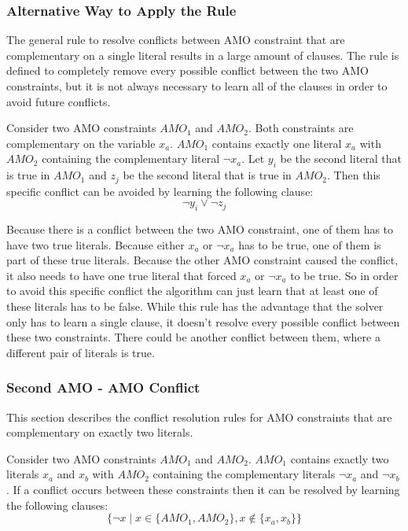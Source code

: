 \subsubsection{Alternative Way to Apply the Rule}

The general rule to resolve conflicts between AMO constraint that are complementary on a single literal results in a large amount of clauses. The rule is defined to completely remove every possible conflict between the two AMO constraints, but it is not always necessary to learn all of the clauses in order to avoid future conflicts.

\begin{leftbar}
Consider two AMO constraints $AMO_1$ and $AMO_2$. Both constraints are complementary on the variable $x_a$. $AMO_1$ contains exactly one literal $x_a$ with $AMO_2$ containing the complementary literal $\neg x_a$. Let $y_i$ be the second literal that is true in $AMO_1$ and $z_j$ be the second literal that is true in $AMO_2$. Then this specific conflict can be avoided by learning the following clause:
\begin{displaymath}
\neg y_i \vee \neg z_j
\end{displaymath}
\end{leftbar}

Because there is a conflict between the two AMO constraint, one of them has to have two true literals. Because either $x_a$ or $\neg x_a$ has to be true, one of them is part of these true literals. Because the other AMO constraint caused the conflict, it also needs to have one true literal that forced $x_a$ or $\neg x_a$ to be true. So in order to avoid this specific conflict the algorithm can just learn that at least one of these literals has to be false. While this rule has the advantage that the solver only has to learn a single clause, it doesn't resolve every possible conflict between these two constraints. There could be another conflict between them, where a different pair of literals is true.

\subsubsection{Second AMO - AMO Conflict}

This section describes the conflict resolution rules for AMO constraints that are complementary on exactly two literals.
\begin{leftbar}
Consider two AMO constraints $AMO_1$ and $AMO_2$. $AMO_1$ contains exactly two literals $x_a$ and $x_b$ with $AMO_2$ containing the complementary literals $\neg x_a$ and $\neg x_b$.
If a conflict occurs between these constraints then it can be resolved by learning the following clauses:
\begin{displaymath}
\{\neg x \; | \; x \in \{AMO_1,AMO_2\}, x \notin \{x_a,x_b\}\}
\end{displaymath}
\end{leftbar}


